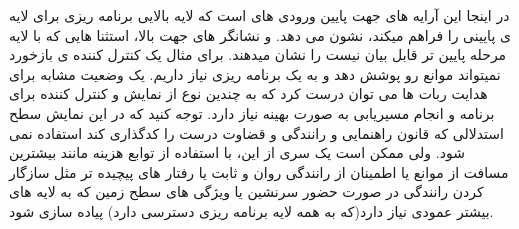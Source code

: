 \par
در اینجا این آرایه های جهت پایین ورودی های است که لایه بالایی برنامه ریزی برای لایه ی پایینی را فراهم
 میکند، نشون می دهد. و نشانگر های جهت بالا، است‍‍ثنا هایی که با لایه مرحله پایین تر قابل بیان نیست را
 نشان میدهند. برای مثال یک کنترل کننده ی بازخورد نمیتواند موانع رو پوشش دهد و به یک برنامه ریزی
  نیاز داریم. 
یک وضعیت مشابه برای هدایت ربات ها می توان درست کرد که به چندین نوع از نمایش و کنترل کننده برای برنامه و انجام مسیریابی به صورت بهینه نیاز دارد.
توجه کنید که در این نمایش  سطح استدلالی که قانون  راهنمایی و رانندگی و قضاوت درست را کدگذاری کند استفاده نمی شود. ولی ممکن است یک سری از این، با استفاده از توابع هزینه مانند بیشترین مسافت از موانع یا اطمینان از رانندگی روان و ثابت یا رفتار های پیچیده تر مثل سازگار کردن رانندگی در صورت حضور سرنشین یا ویژگی های سطح زمین که به لایه های بیشتر عمودی نیاز دارد(که به همه لایه برنامه ریزی دسترسی دارد) پیاده سازی شود.

